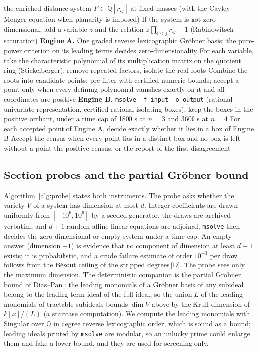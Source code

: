 \documentclass[11pt]{article}
\theoremstyle{definition}
\theoremstyle{remark}
\newcommand{\mk}[1]{\,{\scriptsize[#1]}}
\newcommand{\Dm}{\mk{D}}
\begin{document}
\begin{algorithm}[t]
\caption{Exact positive census at fixed rational masses, with box containment across two engines.}\label{alg:census}
\begin{algorithmic}[1]
\Require the enriched distance system $F\subset\mathbb{Q}[r_{ij}]$ at fixed masses (with the Cayley--Menger equation when planarity is imposed)
\State If the system is not zero-dimensional, add a variable $z$ and the relation $z\prod_{i<j}r_{ij}-1$ (Rabinowitsch saturation)
\State \textbf{Engine A.} One graded reverse lexicographic Gr\"obner basis; the pure-power criterion on its leading terms decides zero-dimensionality
\State For each variable, take the characteristic polynomial of its multiplication matrix on the quotient ring (Stickelberger), remove repeated factors, isolate the real roots
\State Combine the roots into candidate points; pre-filter with certified numeric bounds; accept a point only when every defining polynomial vanishes exactly on it and all coordinates are positive
\State \textbf{Engine B.} \texttt{msolve -f input -o output} (rational univariate representation, certified rational isolating boxes); keep the boxes in the positive orthant, under a time cap of 1800 s at $n=3$ and 3600 s at $n=4$
\State For each accepted point of Engine A, decide exactly whether it lies in a box of Engine B
\State Accept the census when every point lies in a distinct box and no box is left without a point
\Ensure the positive census, or the report of the first disagreement
\end{algorithmic}
\end{algorithm}

\subsection{Section probes and the partial Gr\"obner bound}

Algorithm~\ref{alg:probe} states both instruments. The probe asks whether the variety $V$ of a system has dimension at most $d$. Integer
coefficients are drawn uniformly from $[-10^6,10^6]$ by a seeded generator, the draws are archived
verbatim, and $d+1$ random affine-linear equations are adjoined; \texttt{msolve} then decides
the zero-dimensional or empty system under a time cap. An empty answer (dimension $-1$) is
evidence that no component of dimension at least $d+1$ exists; it is probabilistic, and a crude
failure estimate of order $10^{-3}$ per draw follows from the B\'ezout ceiling of the stripped
degrees\Dm. The probe sees only the maximum dimension. The deterministic companion is the
partial Gr\"obner bound of Dias--Pan \cite{DP18}: the leading monomials of a Gr\"obner basis of
any subideal belong to the leading-term ideal of the full ideal, so the union $L$ of the leading
monomials of tractable subideals bounds $\dim V$ above by the Krull dimension of $k[x]/(L)$ (a
staircase computation). We compute the leading monomials with Singular over $\mathbb{Q}$ in
degree reverse lexicographic order, which is sound as a bound; leading ideals printed by
\texttt{msolve} are modular, so an unlucky prime could enlarge them and fake a lower bound, and
they are used for screening only.
\end{document}
